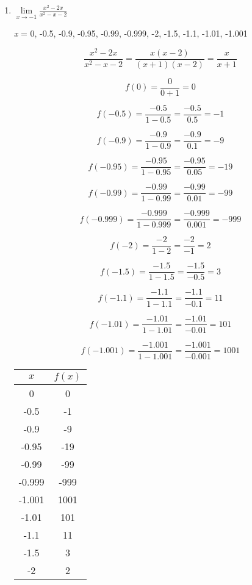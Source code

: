 \documentclass{article}
\begin{document}
\begin{enumerate}
			\item $\lim \limits_{x \to -1} \frac{x^2 - 2x}{x^2 - x - 2}$
			
				\emph{x} = 0, -0.5, -0.9, -0.95, -0.99, -0.999, -2, -1.5, -1.1, -1.01, -1.001
				
				$$\frac{x^2 - 2x}{x^2 - x - 2} = \frac{x(x-2)}{(x + 1)(x - 2)} = \frac{x}{x+1}$$
				
				$$f(0) = \frac{0}{0 + 1} = 0$$
				
				$$f(-0.5) = \frac{-0.5}{1 - 0.5} = \frac{-0.5}{0.5} = -1$$
				
				$$f(-0.9) = \frac{-0.9}{1 - 0.9} = \frac{-0.9}{0.1} = -9$$
				
				$$f(-0.95) = \frac{-0.95}{1 - 0.95} = \frac{-0.95}{0.05} = -19$$
				
				$$f(-0.99) = \frac{-0.99}{1- 0.99} = \frac{-0.99}{0.01} = -99$$
				
				$$f(-0.999) = \frac{-0.999}{1 - 0.999} = \frac{-0.999}{0.001} = -999$$
				
				$$f(-2) = \frac{-2}{1-2} = \frac{-2}{-1} = 2$$
				
				$$f(-1.5)  = \frac{-1.5}{1 - 1.5} = \frac{-1.5}{-0.5} = 3$$
				
				$$f(-1.1) = \frac{-1.1}{1 - 1.1} = \frac{-1.1}{-0.1} = 11$$
				
				$$f(-1.01) = \frac{-1.01}{1 - 1.01} = \frac{-1.01}{-0.01} = 101$$
				
				$$f(-1.001) = \frac{-1.001}{1-1.001} = \frac{-1.001}{-0.001} = 1001$$
				
				\begin{center}
				\begin{tabular}{|c|c|}
					\hline
					$x$ & $f(x)$ \\
					\hline \hline
					0 & 0 \\
					-0.5 & -1 \\
					-0.9 & -9 \\
					-0.95 & -19 \\
					-0.99 & -99 \\
					-0.999 & -999 \\
					-1.001 & 1001 \\
					-1.01 & 101 \\
					-1.1 & 11 \\
					-1.5 & 3 \\
					-2 & 2 \\
					\hline
				\end{tabular}
				\end{center}
				

\end{enumerate}
\end{document}
